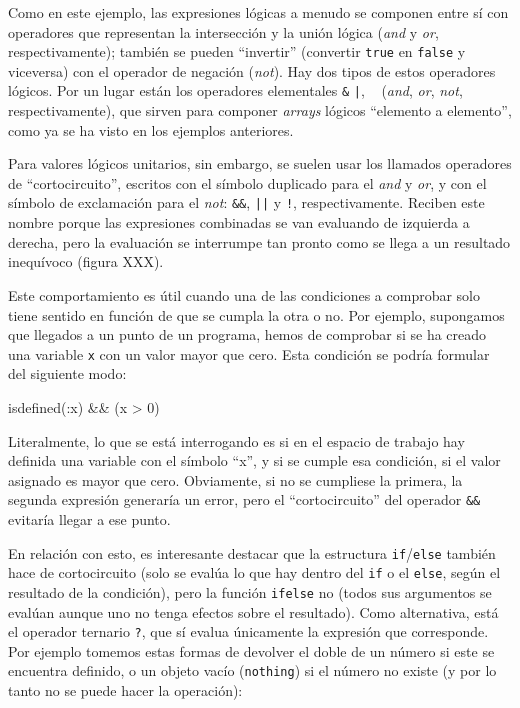 ﻿\documentclass{article}
\newcommand{\jl}{\texttt}
\begin{document}
Como en este ejemplo, las expresiones lógicas a menudo se componen entre sí con operadores que representan la intersección y la unión lógica (\emph{and} y \emph{or}, respectivamente); también se pueden ``invertir'' (convertir \jl{true} en \jl{false} y viceversa) con el operador de negación (\emph{not}). Hay dos tipos de estos operadores lógicos. Por un lugar están los operadores elementales \jl{&} \jl{|}, \jl{~} (\emph{and}, \emph{or}, \emph{not}, respectivamente), que sirven para componer \emph{arrays} lógicos ``elemento a elemento'', como ya se ha visto en los ejemplos anteriores.

Para valores lógicos unitarios, sin embargo, se suelen usar los llamados operadores de ``cortocircuito'', escritos con el símbolo duplicado para el \emph{and} y \emph{or}, y con el símbolo de exclamación para el \emph{not}: \jl{&&}, \jl{||} y \jl{!}, respectivamente. Reciben este nombre porque las expresiones combinadas se van evaluando de izquierda a derecha, pero la evaluación se interrumpe tan pronto como se llega a un resultado inequívoco (figura XXX).

Este comportamiento es útil cuando una de las condiciones a comprobar solo tiene sentido en función de que se cumpla la otra o no. Por ejemplo, supongamos que llegados a un punto de un programa, hemos de comprobar si se ha creado una variable \jl{x} con un valor mayor que cero. Esta condición se podría formular del siguiente modo:

isdefined(:x) && (x > 0)

Literalmente, lo que se está interrogando es si en el espacio de trabajo hay definida una variable con el símbolo ``x'', y si se cumple esa condición, si el valor asignado es mayor que cero. Obviamente, si no se cumpliese la primera, la segunda expresión generaría un error, pero el ``cortocircuito'' del operador \jl{&&} evitaría llegar a ese punto.

En relación con esto, es interesante destacar que la estructura \jl{if}/\jl{else} también hace de cortocircuito (solo se evalúa lo que hay dentro del \jl{if} o el \jl{else}, según el resultado de la condición), pero la función \jl{ifelse} no (todos sus argumentos se evalúan aunque uno no tenga efectos sobre el resultado). Como alternativa, está el operador ternario \jl{?}, que sí evalua únicamente la expresión que corresponde. Por ejemplo tomemos estas formas de devolver el doble de un número si este se encuentra definido, o un objeto vacío (\jl{nothing}) si el número no existe (y por lo tanto no se puede hacer la operación):
\end{document}
